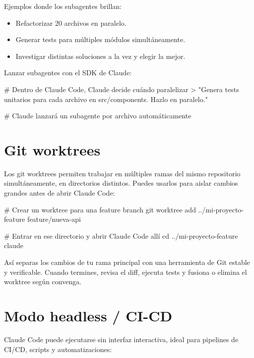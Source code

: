 \documentclass[11pt,a4paper]{book}
\begin{document}
Ejemplos donde los subagentes brillan:

\begin{itemize}\item Refactorizar 20 archivos en paralelo.\end{itemize}
\begin{itemize}\item Generar tests para múltiples módulos simultáneamente.\end{itemize}
\begin{itemize}\item Investigar distintas soluciones a la vez y elegir la mejor.\end{itemize}
Lanzar subagentes con el SDK de Claude:

\begin{codebox}
# Dentro de Claude Code, Claude decide cuándo paralelizar
> "Genera tests unitarios para cada archivo en src/components. Hazlo en paralelo."

# Claude lanzará un subagente por archivo automáticamente
\end{codebox}
\section{Git worktrees}
Los git worktrees permiten trabajar en múltiples ramas del mismo repositorio simultáneamente, en directorios distintos. Puedes usarlos para aislar cambios grandes antes de abrir Claude Code:

\begin{codebox}
# Crear un worktree para una feature branch
git worktree add ../mi-proyecto-feature feature/nueva-api

# Entrar en ese directorio y abrir Claude Code allí
cd ../mi-proyecto-feature
claude
\end{codebox}
Así separas los cambios de tu rama principal con una herramienta de Git estable y verificable. Cuando termines, revisa el diff, ejecuta tests y fusiona o elimina el worktree según convenga.

\section{Modo headless / CI-CD}
Claude Code puede ejecutarse sin interfaz interactiva, ideal para pipelines de CI/CD, scripts y automatizaciones:

\end{document}
